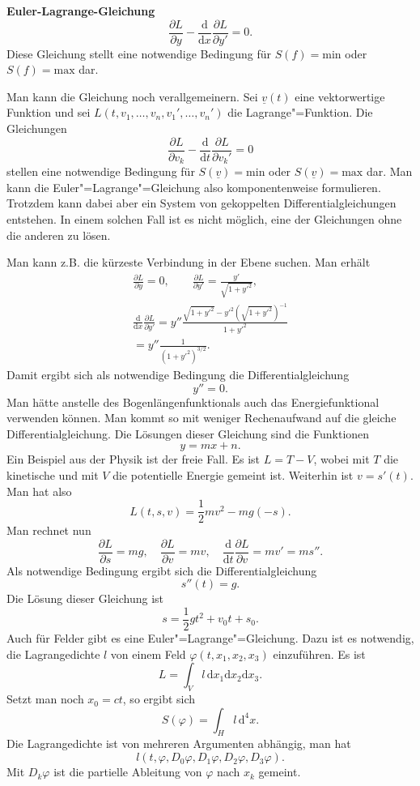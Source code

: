 \documentclass[a4paper,10pt,fleqn,twocolumn,twoside]{article}
\begin{document}
\textbf{Euler-Lagrange-Gleichung}
\[\frac{\partial L}{\partial y}
-\frac{\mathrm d}{\mathrm dx}\frac{\partial L}{\partial y'}
=0.\]
Diese Gleichung stellt eine notwendige Bedingung für
$S(f)=\mathrm{min}$ oder $S(f)=\mathrm{max}$ dar.

Man kann die Gleichung noch verallgemeinern. Sei $\underline v(t)$
eine vektorwertige Funktion und sei
$L(t,v_1,\ldots,v_n,v_1',\ldots,v_n')$ die Lagrange"=Funktion.
Die Gleichungen
\[\frac{\partial L}{\partial v_k}
-\frac{\mathrm d}{\mathrm dt}\frac{\partial L}{\partial v_k'}
=0\]
stellen eine notwendige Bedingung für
$S(\underline v)=\mathrm{min}$ oder
$S(\underline v)=\mathrm{max}$ dar.
Man kann die Euler"=Lagrange"=Gleichung also komponentenweise
formulieren. Trotzdem kann dabei aber ein System von gekoppelten
Differentialgleichungen entstehen. In einem solchen Fall ist es
nicht möglich, eine der Gleichungen ohne die anderen zu lösen.

Man kann z.B. die kürzeste Verbindung in der Ebene suchen. Man erhält
\begin{gather*}
\frac{\partial L}{\partial y} = 0,\qquad
\frac{\partial L}{\partial y'} = \frac{y'}{\sqrt{1+y'^2}},\\
\frac{\mathrm d}{\mathrm dx}\frac{\partial L}{\partial y'}
= y''\frac{\sqrt{1+y'^2}-y'^2(\sqrt{1+y'^2})^{-1}}{1+y'^2}\\
= y''\frac{1}{(1+y'^2)^{3/2}}.
\end{gather*}
Damit ergibt sich als notwendige Bedingung die Differentialgleichung
\[y''=0.\]
Man hätte anstelle des Bogenlängenfunktionals auch das
Energiefunktional verwenden können. Man kommt so mit weniger
Rechenaufwand auf die gleiche Differentialgleichung.
Die Lösungen dieser Gleichung sind die Funktionen
\[y=mx+n.\]
Ein Beispiel aus der Physik ist der freie Fall. Es ist $L=T-V$,
wobei mit $T$ die kinetische und mit $V$ die potentielle Energie
gemeint ist. Weiterhin ist $v=s'(t)$. Man hat also
\[L(t,s,v) = \frac{1}{2}mv^2 - mg(-s).\]
Man rechnet nun
\[
\frac{\partial L}{\partial s} = mg,\quad
\frac{\partial L}{\partial v} = mv,\quad
\frac{\mathrm d}{\mathrm dt}\frac{\partial L}{\partial v}
= mv' = ms''.
\]
Als notwendige Bedingung ergibt sich die Differentialgleichung
\[s''(t) = g.\]
Die Lösung dieser Gleichung ist
\[s=\frac{1}{2}gt^2+v_0t+s_0.\]
%
Auch für Felder gibt es eine Euler"=Lagrange"=Gleichung. Dazu ist es
notwendig, die Lagrangedichte $l$ von einem Feld
$\varphi(t,x_1,x_2,x_3)$ einzuführen. Es ist
\[L = \int_V l\,\mathrm dx_1\mathrm dx_2\mathrm dx_3.\]
Setzt man noch $x_0=ct$, so ergibt sich
\[S(\varphi) = \int_H l\,\mathrm d^4x.\]
Die Lagrangedichte ist von mehreren Argumenten abhängig, man hat
\[l(t,\varphi,D_0\varphi, D_1\varphi, D_2\varphi, D_3\varphi).\]
Mit $D_k\varphi$ ist die partielle Ableitung von $\varphi$
nach $x_k$ gemeint.
\end{document}
